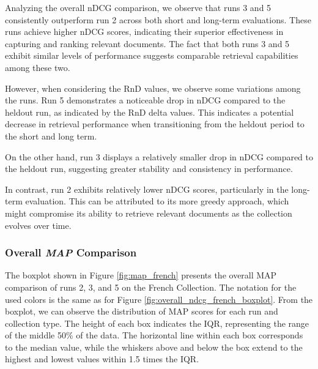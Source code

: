 Analyzing the overall \ac{nDCG} comparison, we observe that runs 3 and 5 consistently outperform run 2 across both short and long-term evaluations. 
These runs achieve higher \ac{nDCG} scores, indicating their superior effectiveness in capturing and ranking relevant documents. 
The fact that both runs 3 and 5 exhibit similar levels of performance suggests comparable retrieval capabilities among these two.

However, when considering the \ac{RnD} values, we observe some variations among the runs. 
Run 5 demonstrates a noticeable drop in \ac{nDCG} compared to the heldout run, as indicated by the \ac{RnD} delta values. 
This indicates a potential decrease in retrieval performance when transitioning from the heldout period to the short and long term.

On the other hand, run 3 displays a relatively smaller drop in \ac{nDCG} compared to the heldout run, suggesting greater stability and consistency in performance.

In contrast, run 2 exhibits relatively lower \ac{nDCG} scores, particularly in the long-term evaluation. This can be attributed to its more greedy approach, which might compromise its ability to retrieve relevant documents as the collection evolves over time.


\newpage
\enlargethispage{7\baselineskip}
\subsubsection{Overall \textit{MAP} Comparison} \label{sec:map_comparison_french}
The boxplot shown in Figure \ref{fig:map_french} presents the overall \ac{MAP} comparison of runs 2, 3, and 5 on the French Collection.
The notation for the used colors is the same as for Figure \ref{fig:overall_ndcg_french_boxplot}.
From the boxplot, we can observe the distribution of \ac{MAP} scores for each run and collection type. The height of each box indicates the \ac{IQR}, representing the range of the middle 50\% of the data. 
The horizontal line within each box corresponds to the median value, while the whiskers above and below the box extend to the highest and lowest values within 1.5 times the \ac{IQR}.

